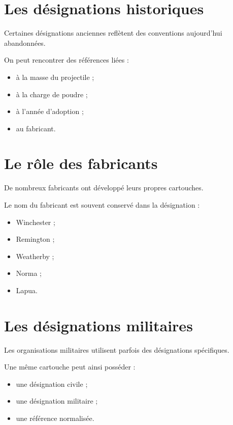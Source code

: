 \section{Les désignations historiques}

Certaines désignations anciennes reflètent des conventions aujourd'hui
abandonnées.

On peut rencontrer des références liées :

\begin{itemize}
    \item à la masse du projectile ;
    \item à la charge de poudre ;
    \item à l'année d'adoption ;
    \item au fabricant.
\end{itemize}

\section{Le rôle des fabricants}

De nombreux fabricants ont développé leurs propres cartouches.

Le nom du fabricant est souvent conservé dans la désignation :

\begin{itemize}
    \item Winchester ;
    \item Remington ;
    \item Weatherby ;
    \item Norma ;
    \item Lapua.
\end{itemize}

\section{Les désignations militaires}

Les organisations militaires utilisent parfois des désignations spécifiques.

Une même cartouche peut ainsi posséder :

\begin{itemize}
    \item une désignation civile ;
    \item une désignation militaire ;
    \item une référence normalisée.
\end{itemize}

